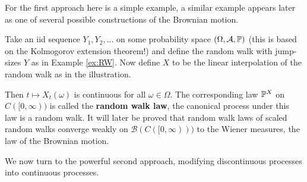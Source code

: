 For the first approach here is a simple example, a similar example appears later as one of several possible constructions of the Brownian motion.
\begin{example}\label{conta}
	Take an iid sequence $Y_1,Y_2,...$ on some probability space $(\Omega,\cA,\mathbb{P})$ (this is based on the Kolmogorov extension theorem!) and define the random walk with jump-sizes $Y$ as in Example \ref{ex:RW}. Now define $X$ to be the linear interpolation of the random walk as in the illustration. 
\begin{figure}[h]
	\begin{center}
\end{center}
\end{figure}
	Then $t\mapsto X_t(\omega)$ is continuous for all $\omega \in \Omega$. The corresponding law $\P^X$ on $C( [0,\infty))$ is called the \textbf{random walk law}, the canonical process under this law is a random walk. It will later be proved that random walk laws of scaled random walks converge weakly on $\mathcal B(C( [0,\infty) ))$ to the Wiener measures, the law of the Brownian motion.
\end{example}
We now turn to the powerful second approach, modifying discontinuous processes into continuous processes.
